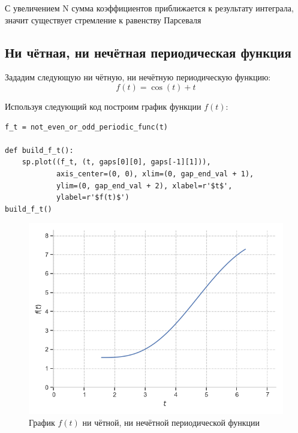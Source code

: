 \documentclass[a4paper, 16pt]{article}
\begin{document}
\noindent С увеличением N сумма коэффициентов приближается к результату интеграла, значит
существует стремление к равенству Парсеваля


\subsection{Ни чётная, ни нечётная периодическая функция}
\noindent Зададим следующую ни чётную, ни нечётную периодическую функцию:
$$f(t)=\cos{(t)}+t$$


\noindent Используя следующий код построим график функции $f(t)$:
\begin{lstlisting}[belowskip=-3mm]
f_t = not_even_or_odd_periodic_func(t)

def build_f_t():
    sp.plot((f_t, (t, gaps[0][0], gaps[-1][1])), 
            axis_center=(0, 0), xlim=(0, gap_end_val + 1), 
            ylim=(0, gap_end_val + 2), xlabel=r'$t$', 
            ylabel=r'$f(t)$')
build_f_t()
\end{lstlisting}
\begin{figure}[!htb]
    \centering
    \includegraphics[scale=0.8]{evodd_f(t).png}
    \captionsetup{skip=0pt}
    \caption{График $f(t)$ ни чётной, ни нечётной периодической функции}
    \label{Рис:29}
\end{figure}
\end{document}
